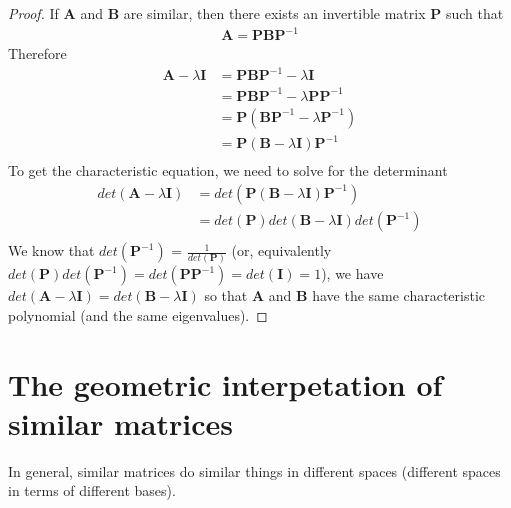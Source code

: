 \documentclass[
]{book}
\theoremstyle{definition}
\theoremstyle{definition}
\theoremstyle{definition}
\theoremstyle{remark}
\begin{document}
\begin{proof}

If \(\mathbf{A}\) and \(\mathbf{B}\) are similar, then there exists an invertible matrix \(\mathbf{P}\) such that
\[
\begin{aligned}
\mathbf{A} = \mathbf{P} \mathbf{B} \mathbf{P}^{-1}
\end{aligned}
\]
Therefore
\[
\begin{aligned}
\mathbf{A}  - \lambda \mathbf{I} & = \mathbf{P} \mathbf{B} \mathbf{P}^{-1} - \lambda \mathbf{I} \\
& = \mathbf{P} \mathbf{B} \mathbf{P}^{-1} - \lambda \mathbf{P} \mathbf{P}^{-1} \\
& =  \mathbf{P} \left( \mathbf{B} \mathbf{P}^{-1} - \lambda \mathbf{P}^{-1} \right) \\
& =  \mathbf{P} \left( \mathbf{B} - \lambda \mathbf{I} \right) \mathbf{P}^{-1}\\
\end{aligned}
\]
To get the characteristic equation, we need to solve for the determinant
\[
\begin{aligned}
det\left( \mathbf{A}  - \lambda \mathbf{I} \right) & = det\left( \mathbf{P} \left( \mathbf{B} - \lambda \mathbf{I} \right) \mathbf{P}^{-1} \right) \\
& = det\left( \mathbf{P} \right)  det\left( \mathbf{B} - \lambda \mathbf{I} \right) det\left(\mathbf{P}^{-1} \right) \\
\end{aligned}
\]
We know that \(det\left(\mathbf{P}^{-1} \right)\) = \(\frac{1}{det\left(\mathbf{P} \right)}\) (or, equivalently \(det\left(\mathbf{P} \right) det\left(\mathbf{P}^{-1} \right) = det\left(\mathbf{P} \mathbf{P}^{-1} \right) = det(\mathbf{I}) = 1\)), we have \(det\left( \mathbf{A} - \lambda \mathbf{I} \right) = det\left( \mathbf{B} - \lambda \mathbf{I} \right)\) so that \(\mathbf{A}\) and \(\mathbf{B}\) have the same characteristic polynomial (and the same eigenvalues).

\end{proof}

\hypertarget{the-geometric-interpetation-of-similar-matrices}{%
\section{The geometric interpetation of similar matrices}\label{the-geometric-interpetation-of-similar-matrices}}

In general, similar matrices do similar things in different spaces (different spaces in terms of different bases).
\end{document}

